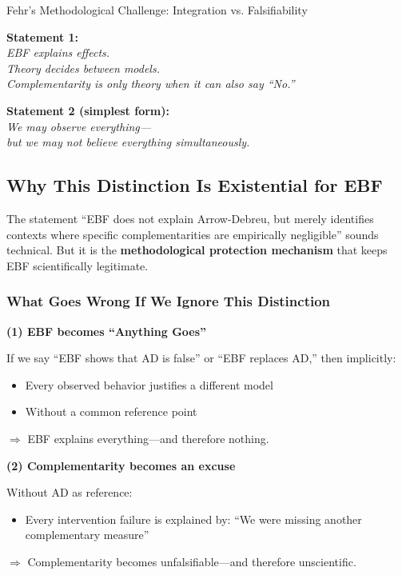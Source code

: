 \begin{chapter}{Fehr's Methodological Challenge: Integration vs. Falsifiability}
\begin{tcolorbox}[colback=green!5!white,colframe=green!75!black,title=\textbf{Memorize These}]
\textbf{Statement 1:}\\
\textit{EBF explains effects.\\
Theory decides between models.\\
Complementarity is only theory when it can also say ``No.''}

\vspace{1em}
\textbf{Statement 2 (simplest form):}\\
\textit{We may observe everything---\\
but we may not believe everything simultaneously.}

\end{tcolorbox}

\subsection{Why This Distinction Is Existential for EBF}

The statement ``EBF does not explain Arrow-Debreu, but merely identifies contexts where
specific complementarities are empirically negligible'' sounds technical. But it is the
\textbf{methodological protection mechanism} that keeps EBF scientifically legitimate.

\subsubsection{What Goes Wrong If We Ignore This Distinction}

\textbf{(1) EBF becomes ``Anything Goes''}

If we say ``EBF shows that AD is false'' or ``EBF replaces AD,'' then implicitly:
\begin{itemize}[noitemsep]
    \item Every observed behavior justifies a different model
    \item Without a common reference point
\end{itemize}
$\Rightarrow$ EBF explains everything---and therefore nothing.

\textbf{(2) Complementarity becomes an excuse}

Without AD as reference:
\begin{itemize}[noitemsep]
    \item Every intervention failure is explained by: ``We were missing another complementary measure''
\end{itemize}
$\Rightarrow$ Complementarity becomes unfalsifiable---and therefore unscientific.


\end{chapter}
